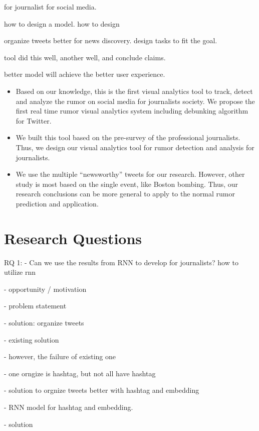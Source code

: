 for journalist for social media. 

how to design a model. how to design 



organize tweets better for news discovery. design tasks to fit the goal. 

tool did this well, another well, and conclude claims. 


better model will achieve the better user experience.  



\begin{itemize}
  \item Based on our knowledge, this is the first visual analytics tool to track, detect and analyze the rumor on social media for journalists society. We propose the first real time rumor visual analytics system including debunking algorithm for Twitter.
  
  \item We built this tool based on the pre-survey of the professional journalists. Thus, we design our visual analytics tool for rumor detection and analysis for journalists. 
  
  \item We use the multiple ``newsworthy” tweets for our research. However, other study is most based on the single event, like Boston bombing. Thus, our research conclusions can be more general to apply to the normal rumor prediction and application. 
\end{itemize}


\section{Research Questions}

RQ 1:
- Can we use the results from RNN to develop for journalists? 
how to utilize rnn 


- opportunity / motivation

- problem statement

- solution: organize tweets

- existing solution

- however, the failure of existing one

- one orngize is hashtag, but not all have hashtag

- solution to orgnize tweets better with hashtag and embedding
 
- RNN model for hashtag and embedding. 

- solution 




